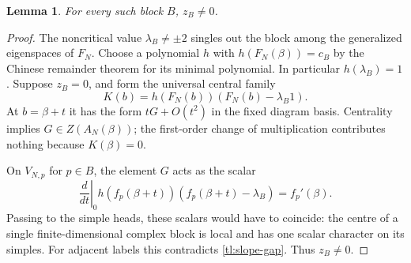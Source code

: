 \documentclass[a4paper,11pt,oneside,reqno]{amsart}
\newtheorem{lemma}[theorem]{Lemma}
\theoremstyle{definition}
\numberwithin{equation}{section}
\begin{document}
	\begin{lemma}\label{tl:zB-nonzero}
		For every such block $B$, $z_B\ne0$.
	\end{lemma}
	\begin{proof}
		The noncritical value $\lambda_B\ne\pm2$ singles out the block
		among the generalized eigenspaces of $F_N$.  Choose a polynomial
		$h$ with $h(F_N(\beta))=c_B$ by the Chinese remainder theorem for
		its minimal polynomial.  In particular $h(\lambda_B)=1$.
		Suppose $z_B=0$, and form the universal central family
		\[
		K(b)=h(F_N(b))(F_N(b)-\lambda_B1).
		\]
		At $b=\beta+t$ it has the form $tG+O(t^2)$ in the fixed diagram
		basis.  Centrality implies $G\in Z(A_N(\beta))$; the first-order
		change of multiplication contributes nothing because $K(\beta)=0$.
		
		On $V_{N,p}$ for $p\in B$, the element $G$ acts as the scalar
		\[
		\left.\frac{d}{dt}\right|_{0}
		h(f_p(\beta+t))(f_p(\beta+t)-\lambda_B)=f_p'(\beta).
		\]
		Passing to the simple heads, these scalars would have to coincide:
		the centre of a single finite-dimensional complex block is local and
		has one scalar character on its simples.  For adjacent labels this
		contradicts \eqref{tl:slope-gap}.  Thus $z_B\ne0$.
	\end{proof}
	
\end{document}
